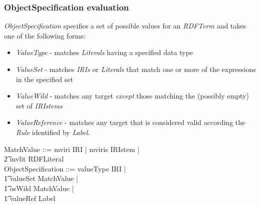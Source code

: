\documentclass[fuzz]{llncs}
\def\zc{\textit}
\begin{document}
\subsubsection{ObjectSpecification evaluation}
\zc{ObjectSpecification} specifies a set of possible values for an \zc{RDFTerm} and takes one of the following forms:
\begin{itemize}
\item \zc{ValueType} - matches \zc{Literals} having a specified data type
\item \zc{ValueSet} - matches \zc{IRIs} or \zc{Literals} that match one or more of the expressions in the specified set
\item \zc{ValueWild} - matches any target \emph{except} those matching the (possibly empty) set of \zc{IRIstems}
\item \zc{ValueReference} - matches any target that is considered valid according the \zc{Rule} identified by \zc{Label}.
\end{itemize}
\begin{zed}
MatchValue ::= mviri \ldata IRI \rdata | mviris \ldata IRIstem \rdata | \\
\t2 mvlit \ldata RDFLiteral \rdata \\
ObjectSpecification ::= valueType \ldata IRI \rdata | \\
\t1 valueSet \ldata \power MatchValue \rdata | \\
\t1 osWild \ldata \power MatchValue \rdata | \\
\t1 valueRef \ldata Label \rdata
\end{zed}
\end{document}
